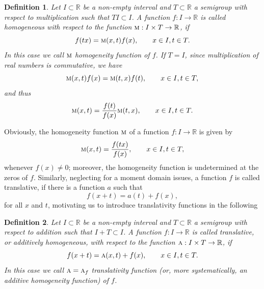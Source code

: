 \documentclass{amsart}
\theoremstyle{plain}
\newtheorem{definition}{Definition}
\numberwithin{equation}{section}
\newcommand{\term}[1]{\textit{#1}}
\newcommand{\mh}{\textsc{m}}
\newcommand{\R}{{\mathbb{R}}}
\begin{document}
\begin{definition}
Let $I \subset \R$ be a non-empty interval and $T \subset \R$ a semigroup with respect to multiplication such that $T I \subset I $.
A function $f: I \to \R$ is called homogeneous with respect to the function $\mh: I \times T \to \R$, if
%
\begin{equation*}
f(tx)=\mh(x,t) f(x), \qquad x \in I, t \in T.
\end{equation*}
In this case we call $\mh$ \term{homogeneity function} of $f$. %
If $T=I$, since multiplication of real numbers is commutative, 
we have
\begin{equation*}
\textsc{m}(x,t) f(x) = \textsc{m}(t,x) f(t), \qquad x \in I, t \in T,
\end{equation*}
and thus
\begin{equation*}
\textsc{m}(x,t)  = \frac{f(t)}{f(x)} \textsc{m}(t,x)  , \qquad x \in I, t \in T.
\end{equation*}
\end{definition}

Obviously, the homogeneity function $\textsc{m}$ of a  function $f: I \to \R$ is given by
\begin{equation*}
\textsc{m}(x,t)=\frac{f(tx)}{f(x)}, \qquad x \in I, t \in T,
\end{equation*} 
whenever $f(x) \neq 0$; moreover, the homogeneity function is undetermined at the zeros of $f$.
%
Similarly, neglecting for a moment domain issues, a function $f$ is called translative, if
there is a function $a$ such that
\begin{equation*}
f(x+t)=a(t)+f(x),
\end{equation*}
for all $x$ and $t$,
motivating us to introduce translativity functions in the following

\begin{definition}
Let $I \subset \R$ be a non-empty interval and $T \subset \R$ a semigroup with respect to addition such that $I+T  \subset I$.
A function $f: I \to \R$ is called translative, or \textit{additively homogeneous}, 
with respect to the function $\textsc{a}: I \times T  \to \R$, if
%
\begin{equation*}
f(x+t)=\textsc{a}(x,t)+ f(x), \qquad x \in I, t \in T.
\end{equation*}
In this case we call $\textsc{a} =\textsc{a}_f$ translativity function (or, more systematically, an additive homogeneity function) of $f$.
\end{definition}
\end{document}
